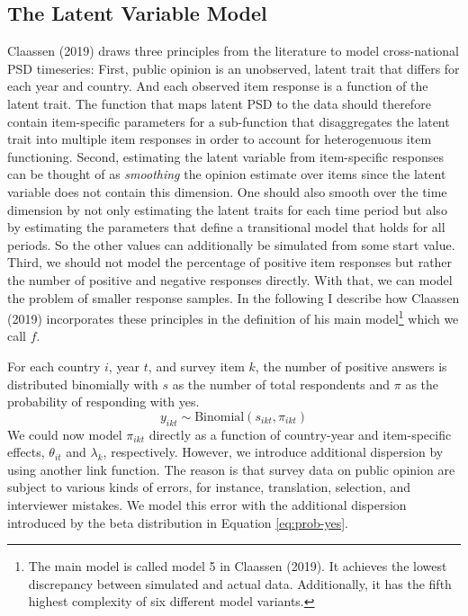 \documentclass[12pt,english,a4paper,oneside]{article}
\theoremstyle{definition}
\theoremstyle{definition}
\theoremstyle{definition}
\theoremstyle{definition}
\theoremstyle{remark}
\begin{document}
\hypertarget{the-latent-variable-model}{%
\subsection{The Latent Variable Model}\label{the-latent-variable-model}}

Claassen (2019) draws three principles from the literature to model cross-national PSD timeseries: First, public opinion is an unobserved, latent trait that differs for each year and country. And each observed item response is a function of the latent trait. The function that maps latent PSD to the data should therefore contain item-specific parameters for a sub-function that disaggregates the latent trait into multiple item responses in order to account for heterogenuous item functioning. Second, estimating the latent variable from item-specific responses can be thought of as \emph{smoothing} the opinion estimate over items since the latent variable does not contain this dimension. One should also smooth over the time dimension by not only estimating the latent traits for each time period but also by estimating the parameters that define a transitional model that holds for all periods. So the other values can additionally be simulated from some start value. Third, we should not model the percentage of positive item responses but rather the number of positive and negative responses directly. With that, we can model the problem of smaller response samples. In the following I describe how Claassen (2019) incorporates these principles in the definition of his main model\footnote{The main model is called model 5 in Claassen (2019). It achieves the lowest discrepancy between simulated and actual data. Additionally, it has the fifth highest complexity of six different model variants.} which we call \(f\).\newline

\noindent
For each country \(i\), year \(t\), and survey item \(k\), the number of positive answers is distributed binomially with \(s\) as the number of total respondents and \(\pi\) as the probability of responding with yes.
\begin{equation}
\label{eq:num-resp}
y_{ikt} \sim \text{Binomial}(s_{ikt}, \pi_{ikt})
\end{equation}
We could now model \(\pi_{ikt}\) directly as a function of country-year and item-specific effects, \(\theta_{it}\) and \(\lambda_k\), respectively. However, we introduce additional dispersion by using another link function. The reason is that survey data on public opinion are subject to various kinds of errors, for instance, translation, selection, and interviewer mistakes. We model this error with the additional dispersion introduced by the beta distribution in Equation \eqref{eq:prob-yes}.
\end{document}
